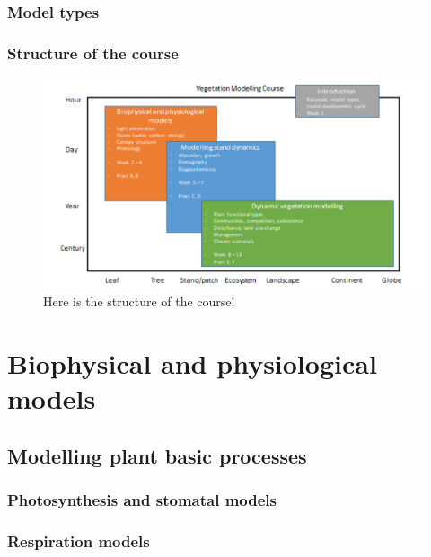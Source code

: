 \documentclass[]{book}
\begin{document}
\section{Model types}\label{model-types}

\section{Structure of the course}\label{structure-of-the-course}

\begin{figure}

{\centering \includegraphics[width=0.8\linewidth]{figures/Figure_course} 

}

\caption{Here is the structure of the course!}\label{fig:nice-fig2}
\end{figure}

\part{Biophysical and physiological
models}\label{part-biophysical-and-physiological-models}

\chapter{Modelling plant basic
processes}\label{modelling-plant-basic-processes}


\section{Photosynthesis and stomatal
models}\label{photosynthesis-and-stomatal-models}

\section{Respiration models}\label{respiration-models}
\end{document}
